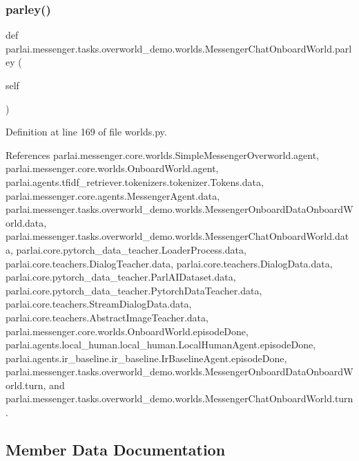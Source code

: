 \subsubsection{\texorpdfstring{parley()}{parley()}}
{\footnotesize\ttfamily def parlai.\+messenger.\+tasks.\+overworld\+\_\+demo.\+worlds.\+Messenger\+Chat\+Onboard\+World.\+parley (\begin{DoxyParamCaption}\item[{}]{self }\end{DoxyParamCaption})}



Definition at line 169 of file worlds.\+py.



References parlai.\+messenger.\+core.\+worlds.\+Simple\+Messenger\+Overworld.\+agent, parlai.\+messenger.\+core.\+worlds.\+Onboard\+World.\+agent, parlai.\+agents.\+tfidf\+\_\+retriever.\+tokenizers.\+tokenizer.\+Tokens.\+data, parlai.\+messenger.\+core.\+agents.\+Messenger\+Agent.\+data, parlai.\+messenger.\+tasks.\+overworld\+\_\+demo.\+worlds.\+Messenger\+Onboard\+Data\+Onboard\+World.\+data, parlai.\+messenger.\+tasks.\+overworld\+\_\+demo.\+worlds.\+Messenger\+Chat\+Onboard\+World.\+data, parlai.\+core.\+pytorch\+\_\+data\+\_\+teacher.\+Loader\+Process.\+data, parlai.\+core.\+teachers.\+Dialog\+Teacher.\+data, parlai.\+core.\+teachers.\+Dialog\+Data.\+data, parlai.\+core.\+pytorch\+\_\+data\+\_\+teacher.\+Parl\+A\+I\+Dataset.\+data, parlai.\+core.\+pytorch\+\_\+data\+\_\+teacher.\+Pytorch\+Data\+Teacher.\+data, parlai.\+core.\+teachers.\+Stream\+Dialog\+Data.\+data, parlai.\+core.\+teachers.\+Abstract\+Image\+Teacher.\+data, parlai.\+messenger.\+core.\+worlds.\+Onboard\+World.\+episode\+Done, parlai.\+agents.\+local\+\_\+human.\+local\+\_\+human.\+Local\+Human\+Agent.\+episode\+Done, parlai.\+agents.\+ir\+\_\+baseline.\+ir\+\_\+baseline.\+Ir\+Baseline\+Agent.\+episode\+Done, parlai.\+messenger.\+tasks.\+overworld\+\_\+demo.\+worlds.\+Messenger\+Onboard\+Data\+Onboard\+World.\+turn, and parlai.\+messenger.\+tasks.\+overworld\+\_\+demo.\+worlds.\+Messenger\+Chat\+Onboard\+World.\+turn.



\subsection{Member Data Documentation}
\mbox{\label{classparlai_1_1messenger_1_1tasks_1_1overworld__demo_1_1worlds_1_1MessengerChatOnboardWorld_ae99673acdcb2895473f747dbc433c874}} 
